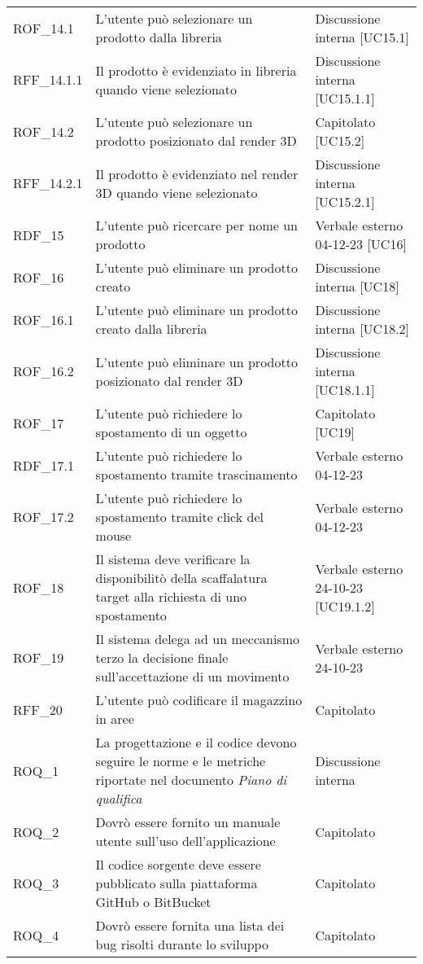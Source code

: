 \begin{xltabular}{\textwidth}{ p{0.2\textwidth} | X | p{0.2\textwidth} }
    ROF\_14.1& L'utente può selezionare un prodotto dalla libreria & Discussione interna [UC15.1]\\
    RFF\_14.1.1& Il prodotto è evidenziato in libreria quando viene selezionato & Discussione interna [UC15.1.1]\\
    ROF\_14.2& L'utente può selezionare un prodotto posizionato dal render 3D & Capitolato [UC15.2]\\
    RFF\_14.2.1& Il prodotto è evidenziato nel render 3D quando viene selezionato & Discussione interna [UC15.2.1]\\
    RDF\_15& L'utente può ricercare per nome un prodotto & Verbale esterno 04-12-23 [UC16]\\
    ROF\_16& L'utente può eliminare un prodotto creato & Discussione interna [UC18]\\
    ROF\_16.1& L'utente può eliminare un prodotto creato dalla libreria & Discussione interna [UC18.2]\\
    ROF\_16.2& L'utente può eliminare un prodotto posizionato dal render 3D & Discussione interna [UC18.1.1]\\
    ROF\_17& L'utente può richiedere lo spostamento di un oggetto & Capitolato [UC19]\\
    RDF\_17.1& L'utente può richiedere lo spostamento tramite trascinamento & Verbale esterno 04-12-23\\
    ROF\_17.2& L'utente può richiedere lo spostamento tramite click del mouse & Verbale esterno 04-12-23\\
    ROF\_18& Il sistema deve verificare la disponibilitò della scaffalatura target alla richiesta di uno spostamento & Verbale esterno 24-10-23 [UC19.1.2]\\
    ROF\_19& Il sistema delega ad un meccanismo terzo la decisione finale sull'accettazione di un movimento & Verbale esterno 24-10-23\\
    RFF\_20& L'utente può codificare il magazzino in aree & Capitolato \\
    ROQ\_1& La progettazione e il codice devono seguire le norme e le metriche riportate nel documento \textit{Piano di qualifica} & Discussione interna \\
    ROQ\_2& Dovrò essere fornito un manuale utente sull'uso dell'applicazione & Capitolato \\
    ROQ\_3& Il codice sorgente deve essere pubblicato sulla piattaforma GitHub o BitBucket & Capitolato \\
    ROQ\_4& Dovrò essere fornita una lista dei bug risolti durante lo sviluppo & Capitolato  \\

\end{xltabular}
